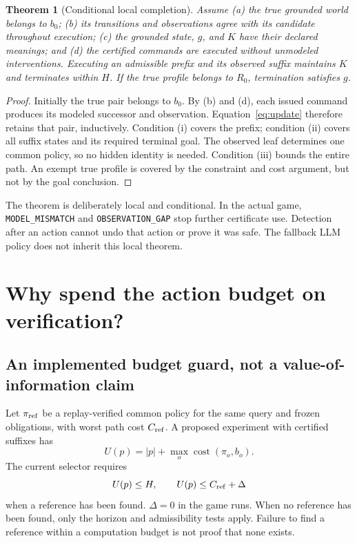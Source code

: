 \documentclass[11pt]{article}
\newtheorem{theorem}{Theorem}[section]
\theoremstyle{definition}
\newcommand{\cost}{\operatorname{cost}}
\begin{document}
\begin{theorem}[Conditional local completion]\label{thm:local}
Assume (a) the true grounded world belongs to $b_0$; (b) its transitions and
observations agree with its candidate throughout execution; (c) the grounded
state, $g$, and $K$ have their declared meanings; and (d) the certified commands
are executed without unmodeled interventions. Executing an admissible prefix
and its observed suffix maintains $K$ and terminates within $H$. If the true
profile belongs to $R_0$, termination satisfies $g$.
\end{theorem}
\begin{proof}
Initially the true pair belongs to $b_0$. By (b) and (d), each issued command
produces its modeled successor and observation. Equation~\eqref{eq:update}
therefore retains that pair, inductively. Condition (i) covers the prefix;
condition (ii) covers all suffix states and its required terminal goal. The
observed leaf determines one common policy, so no hidden identity is needed.
Condition (iii) bounds the entire path. An exempt true profile is covered by the
constraint and cost argument, but not by the goal conclusion.
\end{proof}
The theorem is deliberately local and conditional. In the actual game,
\texttt{MODEL\_MISMATCH} and \texttt{OBSERVATION\_GAP} stop further certificate
use. Detection after an action cannot undo that action or prove it was safe.
The fallback LLM policy does not inherit this local theorem.

\section{Why spend the action budget on verification?}
\subsection{An implemented budget guard, not a value-of-information claim}
Let $\pi_{\rm ref}$ be a replay-verified common policy for the same query and
frozen obligations, with worst path cost $C_{\rm ref}$. A proposed experiment
with certified suffixes has
\begin{equation}\label{eq:cost}
 U(p)=|p|+\max_o\cost(\pi_o,b_o).
\end{equation}
The current selector requires
\begin{equation}\label{eq:allowance}
 U(p)\leq H,\qquad U(p)\leq C_{\rm ref}+\Delta
\end{equation}
when a reference has been found. $\Delta=0$ in the game runs. When no reference
has been found, only the horizon and admissibility tests apply. Failure to find
a reference within a computation budget is not proof that none exists.
\end{document}
